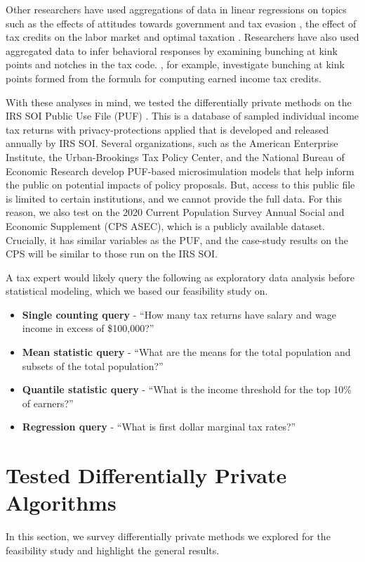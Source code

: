 Other researchers have used aggregations of data in linear regressions on topics such as the effects of attitudes towards government and tax evasion \citep{cullen2021political}, the effect of tax credits on the labor market \citep{tong2014impact} and optimal taxation \citep{piketty2014optimal}. Researchers have also used aggregated data to infer behavioral responses by examining bunching at kink points \citep{chetty2011adjustment} and notches \citep{kleven2013using} in the tax code. \citet{mortenson2020bunching}, for example, investigate bunching at kink points formed from the formula for computing earned income tax credits.

With these analyses in mind, we tested the differentially private methods on the IRS SOI Public Use File (PUF) \citep{barrientos2021}. This is a database of sampled individual income tax returns with privacy-protections applied that is developed and released annually by IRS SOI. Several organizations, such as the American Enterprise Institute, the Urban-Brookings Tax Policy Center, and the National Bureau of Economic Research develop PUF-based microsimulation models that help inform the public on potential impacts of policy proposals. But, access to this public file is limited to certain institutions, and we cannot provide the full data. For this reason, we also test on the 2020 Current Population Survey Annual Social and Economic Supplement (CPS ASEC), which is a publicly available dataset. Crucially, it has similar variables as the PUF, and the case-study results on the CPS will be similar to those run on the IRS SOI.

A tax expert would likely query the following as exploratory data analysis before statistical modeling, which we based our feasibility study on.

\begin{itemize}
    \item \textbf{Single counting query} - ``How many tax returns have salary and wage income in excess of \$100,000?''
    \item \textbf{Mean statistic query} - ``What are the means for the total population and subsets of the total population?''
    \item \textbf{Quantile statistic query} - ``What is the income threshold for the top 10\% of earners?''
    \item \textbf{Regression query} - ``What is first dollar marginal tax rates?''
\end{itemize}

\section{Tested Differentially Private Algorithms}\label{sec:dp-mech}
In this section, we survey differentially private methods we explored for the feasibility study and highlight the general results.

